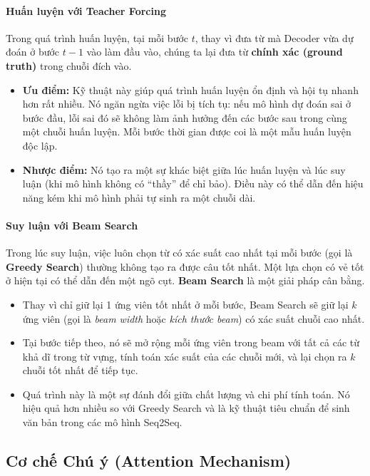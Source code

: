 \paragraph{Huấn luyện với Teacher Forcing}
Trong quá trình huấn luyện, tại mỗi bước $t$, thay vì đưa từ mà Decoder vừa dự đoán ở bước $t-1$ vào làm đầu vào, chúng ta lại đưa từ \textbf{chính xác (ground truth)} trong chuỗi đích vào.
\begin{itemize}
    \item \textbf{Ưu điểm:} Kỹ thuật này giúp quá trình huấn luyện ổn định và hội tụ nhanh hơn rất nhiều. Nó ngăn ngừa việc lỗi bị tích tụ: nếu mô hình dự đoán sai ở bước đầu, lỗi sai đó sẽ không làm ảnh hưởng đến các bước sau trong cùng một chuỗi huấn luyện. Mỗi bước thời gian được coi là một mẫu huấn luyện độc lập.
    \item \textbf{Nhược điểm:} Nó tạo ra một sự khác biệt giữa lúc huấn luyện và lúc suy luận (khi mô hình không có “thầy” để chỉ bảo). Điều này có thể dẫn đến hiệu năng kém khi mô hình phải tự sinh ra một chuỗi dài.
\end{itemize}

\paragraph{Suy luận với Beam Search}
Trong lúc suy luận, việc luôn chọn từ có xác suất cao nhất tại mỗi bước (gọi là \textbf{Greedy Search}) thường không tạo ra được câu tốt nhất. Một lựa chọn có vẻ tốt ở hiện tại có thể dẫn đến một ngõ cụt. \textbf{Beam Search} là một giải pháp cân bằng.
\begin{itemize}
    \item Thay vì chỉ giữ lại 1 ứng viên tốt nhất ở mỗi bước, Beam Search sẽ giữ lại $k$ ứng viên (gọi là \textit{beam width} hoặc \textit{kích thước beam}) có xác suất chuỗi cao nhất.
    \item Tại bước tiếp theo, nó sẽ mở rộng mỗi ứng viên trong beam với tất cả các từ khả dĩ trong từ vựng, tính toán xác suất của các chuỗi mới, và lại chọn ra $k$ chuỗi tốt nhất để tiếp tục.
    \item Quá trình này là một sự đánh đổi giữa chất lượng và chi phí tính toán. Nó hiệu quả hơn nhiều so với Greedy Search và là kỹ thuật tiêu chuẩn để sinh văn bản trong các mô hình Seq2Seq.
\end{itemize}
\subsection{Cơ chế Chú ý (Attention Mechanism)}
\label{ssec:attention}

